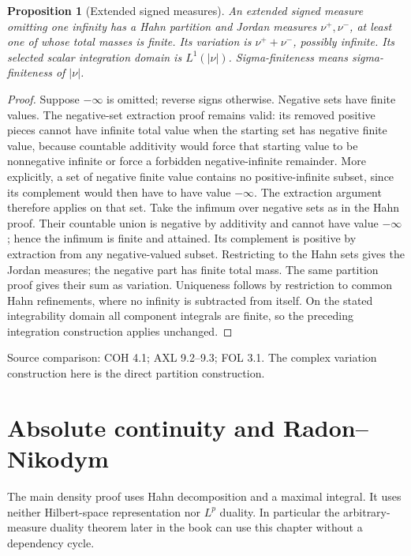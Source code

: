 \documentclass[11pt,oneside,openany]{book}
\newtheorem{proposition}[theorem]{Proposition}
\theoremstyle{definition}
\theoremstyle{remark}
\newcommand{\family}[1]{}
\newcommand{\source}[1]{\par\begingroup\small\sffamily\color{black!65}Source comparison: #1\par\endgroup}
\begin{document}
\begin{proposition}[Extended signed measures]\family{D11.14.extended_signed_variant}\label{d11:14:extended-signed-variant}
An extended signed measure omitting one infinity has a Hahn partition and
Jordan measures $\nu^+,\nu^-$, at least one of whose total masses is finite.
Its variation is $\nu^++\nu^-$, possibly infinite. Its selected scalar
integration domain is $L^1(|\nu|)$. Sigma-finiteness means sigma-finiteness
of $|\nu|$.
\end{proposition}
\begin{proof}
Suppose $-\infty$ is omitted; reverse signs otherwise. Negative sets have
finite values. The negative-set extraction proof remains valid: its removed
positive pieces cannot have infinite total value when the starting set has
negative finite value, because countable additivity would force that starting
value to be nonnegative infinite or force a forbidden negative-infinite
remainder. More explicitly, a set of negative finite value contains no
positive-infinite subset, since its complement would then have to have
value $-\infty$. The extraction argument therefore applies on that set.
Take the infimum over negative sets as in the Hahn proof. Their countable
union is negative by additivity and cannot have value $-\infty$; hence the
infimum is finite and attained. Its complement is positive by extraction
from any negative-valued subset. Restricting to the Hahn sets gives the
Jordan measures; the negative part has finite total mass. The same
partition proof gives their sum as variation. Uniqueness follows by
restriction to common Hahn refinements, where no infinity is subtracted
from itself. On the stated integrability domain all component integrals
are finite, so the preceding integration construction applies unchanged.
\end{proof}
\source{COH 4.1; AXL 9.2--9.3; FOL 3.1. The complex variation construction here is the direct partition construction.}



\chapter{Absolute continuity and Radon--Nikodym}\label{ch:d11-15}

The main density proof uses Hahn decomposition and a maximal integral.
It uses neither Hilbert-space representation nor $L^p$ duality. In particular
the arbitrary-measure duality theorem later in the book can use this chapter
without a dependency cycle.
\end{document}
